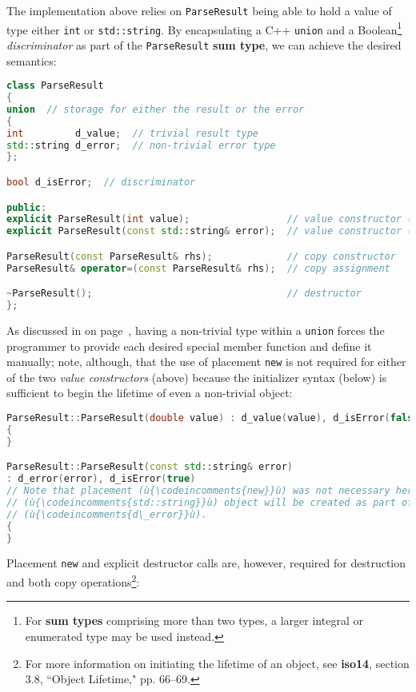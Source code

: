 \noindent The implementation above relies on \texttt{ParseResult} being able to
hold a value of type either \texttt{int} or \texttt{std::string}. By
encapsulating a C++ \texttt{union} and a Boolean{\cprotect\footnote{For
\textbf{sum types} comprising more than two types, a larger integral
or enumerated type may be used instead.}} \emph{discriminator} as part
of the \texttt{ParseResult} \textbf{sum type}, we can achieve the
desired semantics:

\begin{lstlisting}[language=C++]
class ParseResult
{
union  // storage for either the result or the error
{
int         d_value;  // trivial result type
std::string d_error;  // non-trivial error type
};

bool d_isError;  // discriminator

public:
explicit ParseResult(int value);                 // value constructor (1)
explicit ParseResult(const std::string& error);  // value constructor (2)

ParseResult(const ParseResult& rhs);             // copy constructor
ParseResult& operator=(const ParseResult& rhs);  // copy assignment

~ParseResult();                                  // destructor
};
\end{lstlisting}

\noindent As discussed in {\it{}} on page~\pageref{unrestrictedunion-description}, having a non-trivial
type within a \texttt{union} forces the programmer to provide each
desired special member function and define it manually; note, although,
that the use of placement \texttt{new} is not required for either of the
two \emph{value constructors} (above) because the initializer syntax
(below) is sufficient to begin the lifetime of even a non-trivial
object:

\begin{lstlisting}[language=C++]
ParseResult::ParseResult(double value) : d_value(value), d_isError(false)
{
}

ParseResult::ParseResult(const std::string& error)
: d_error(error), d_isError(true)
// Note that placement (ù{\codeincomments{new}}ù) was not necessary here because a new
// (ù{\codeincomments{std::string}}ù) object will be created as part of the initialization of
// (ù{\codeincomments{d\_error}}ù).
{
}
\end{lstlisting}

\noindent Placement \texttt{new} and explicit destructor calls are, however,
required for destruction and both copy operations{\cprotect\footnote{For
more information on initiating the lifetime of an object, see \textbf{iso14}, section 3.8, ``Object Lifetime," pp. 66--69.}}:

